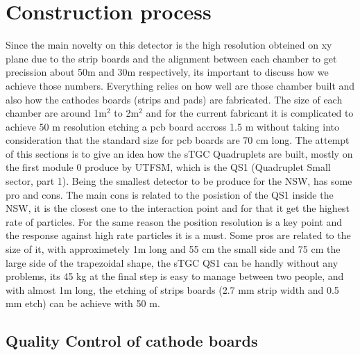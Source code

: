 \section{Construction process}
Since the main novelty on this detector is the high resolution obteined on xy plane due to the strip boards and the alignment between each chamber to get
precission about 50\micro m and 30\micro m respectively, its important to discuss how we achieve those numbers. Everything relies on how well are those chamber
built and also how the cathodes boards (strips and pads) are fabricated. The size of each chamber are around 1m$^2$ to 2m$^2$ and for the current fabricant it
is complicated to achieve 50 \micro m resolution etching a pcb board accross 1.5 m without taking into consideration that the standard size for pcb boards are
70 cm long.  The attempt of this sections is to give an idea how the sTGC Quadruplets are built, mostly on the first module 0 produce by UTFSM, which is the QS1
(Quadruplet Small sector, part 1).  Being the smallest detector to be produce for the NSW, has some pro and cons. The main cons is related to the posistion of
the QS1 inside the NSW, it is the closest one to the interaction point and for that it get the highest rate of particles. For the same reason the position
resolution is a key point and the response against high rate particles it is a must.  Some pros are related to the size of it, with approximetely 1m long and 55
cm the small side and 75 cm the large side of the trapezoidal shape, the sTGC QS1 can be handly without any problems, its 45 kg at the final step is easy to
manage between two people, and with almost 1m long, the etching of strips boards (2.7 mm strip width and 0.5 mm etch) can be achieve with 50 \micro m. 

\subsection{Quality Control of cathode boards}

